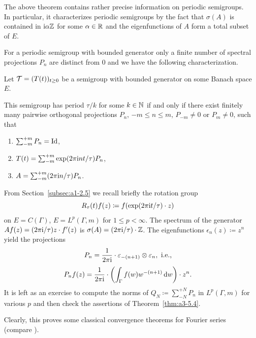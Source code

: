 The above theorem contains rather precise information on periodic semigroups.
In particular, it characterizes periodic semigroups by the fact that $\sigma(A)$ is contained in $\mathrm{i}\alpha\mathbb{Z}$ for some $\alpha \in \mathbb{R}$ and the eigenfunctions of\/ $A$ form a total subset of\/ $E$.

For a periodic semigroup with bounded generator
only a finite number of spectral projections $P_{n}$ are distinct from $0$ and we have the following characterization.
\begin{corollary}\label{cor:a3-5.5}
Let $\TT = (T(t))_{t \geq 0}$ be a semigroup with bounded generator on some Banach space $E$.

This semigroup has period $\tau/k$ for some $k \in \mathbb{N}$ if and only if there exist finitely many pairwise orthogonal projections $P_{n}$, $-m \leq n \leq m$, $P_{-m} \neq 0$ or $P_{m} \neq 0$, such that
\begin{enumerate}[\upshape (i)]
\item 
$\sum_{-m}^{+m} P_{n} =  \operatorname{Id}$,

\item 
$T(t) = \sum_{-m}^{+m} \exp(2\pi\mathrm{i} nt/\tau)P_{n}$,

\item 
$A = \sum_{-m}^{+m} (2\pi\mathrm{i} n/\tau)P_{n}$. 

\end{enumerate}
\end{corollary}
\begin{example}\label{ex:a3-5.6} 
From Section~\ref{subsec:a1-2.5} we recall briefly the rotation group
\[
R_{\tau}(t)f(z) \coloneq f(\exp(2\pi\mathrm{i} t/\tau) \cdot z)
\]
on $E = C(\Gamma)$, \resp $E = L^{p}(\Gamma,m)$ for $1 \leq p < \infty$.
The spectrum of the generator
$Af(z) = (2\pi\mathrm{i} /\tau)z \cdot f'(z)$
is $\sigma(A) = (2\pi\mathrm{i} /\tau) \cdot\mathbb{Z}$.
The eigenfunctions $\epsilon_{n}(z) \coloneq z^{n}$ yield the projections
\[
P_{n} = \frac{1}{2\pi \iu} \cdot\epsilon_{-(n+1)} \otimes \epsilon_{n}, \text{ \ie }
\]
\[
P_{n}f(z) = \frac{1}{2\pi \mathrm{i}}  \cdot \left( \int_{\Gamma} f(w)w^{-(n+1)} \mathop{}\!\mathrm{d}{w} \right)\cdot z^{n} .
\]
It is left as an exercise to compute the norms of\/ $Q_{N} \coloneq \sum_{-N}^{+N} P_{n}$ in $L^{p}(\Gamma,m)$ for various $p$ and then check the assertions of Theorem~\ref{thm:a3-5.4}.

Clearly, this proves some classical convergence theorems for Fourier series (compare \textcite[Chap.~8.1]{davies:1980}).
\end{example}

